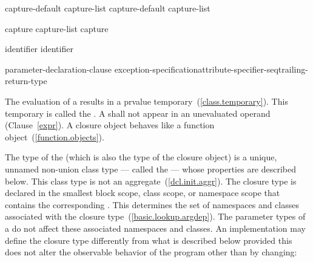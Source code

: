 \begin{bnf}
\br
    capture-default\br
    capture-list\br
    capture-default \terminal{,} capture-list
\end{bnf}

\begin{bnf}
\br
    \terminal{\&}\br
    \terminal{=}
\end{bnf}

\begin{bnf}
\br
    capture \br
    capture-list \terminal{,} capture 
\end{bnf}

\begin{bnf}
\br
    identifier\br
    \terminal{\&} identifier\br
\end{bnf}

\begin{bnf}
\br
    \terminal{(} parameter-declaration-clause \terminal{)} \opt\br
    \hspace*{\bnfindentinc}exception-specification\opt attribute-specifier-seq\opt trailing-return-type\opt
\end{bnf}

\pnum
The evaluation of a  results in a prvalue
temporary~(\ref{class.temporary}). This temporary is called the . A
 shall not appear in an unevaluated operand
(Clause~\ref{expr}). \enternote A closure object behaves like a function
object~(\ref{function.objects}).\exitnote

\pnum
The type of the  (which is also the type of the
closure object) is a unique, unnamed non-union class type --- called the  --- whose properties are described below. This class type is not an
aggregate~(\ref{dcl.init.aggr}). The closure type is declared in the smallest block
scope, class scope, or namespace scope that contains the corresponding
. \enternote This determines the set of namespaces and
classes associated with the closure type~(\ref{basic.lookup.argdep}). The parameter
types of a  do not affect these associated namespaces and
classes. \exitnote An implementation may define the closure type differently from what
is described below provided this does not alter the observable behavior of the program
other than by changing:

